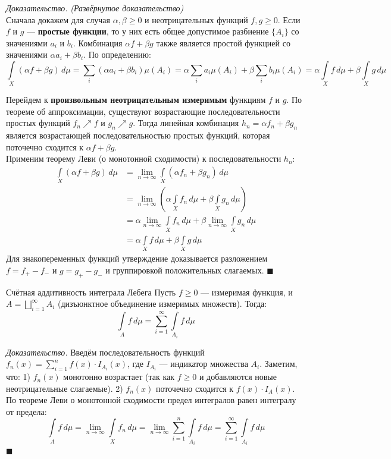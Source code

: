\documentclass[12pt,a4paper]{article}
\newenvironment{Proof}[1][Доказательство]{\vspace{0.5em}\noindent\textit{#1.}\hspace{0.5em}\ignorespaces}{\hfill$\blacksquare$\vspace{1em}}
\begin{document}
\begin{Proof}
\textit{(Развёрнутое доказательство)} \\
Сначала докажем для случая $\alpha, \beta \ge 0$ и неотрицательных функций $f, g \ge 0$.
Если $f$ и $g$ — \textbf{простые функции}, то у них есть общее допустимое разбиение $\{A_i\}$ со значениями $a_i$ и $b_i$. Комбинация $\alpha f + \beta g$ также является простой функцией со значениями $\alpha a_i + \beta b_i$. По определению:
$$ \int\limits_X (\alpha f + \beta g) \, d\mu = \sum\limits_{i} (\alpha a_i + \beta b_i) \mu(A_i) = \alpha \sum\limits_{i} a_i \mu(A_i) + \beta \sum\limits_{i} b_i \mu(A_i) = \alpha \int\limits_X f \, d\mu + \beta \int\limits_X g \, d\mu $$

Перейдем к \textbf{произвольным неотрицательным измеримым} функциям $f$ и $g$. По теореме об аппроксимации, существуют возрастающие последовательности простых функций $f_n \nearrow f$ и $g_n \nearrow g$. 
Тогда линейная комбинация $h_n = \alpha f_n + \beta g_n$ является возрастающей последовательностью простых функций, которая поточечно сходится к $\alpha f + \beta g$. \\
Применим теорему Леви (о монотонной сходимости) к последовательности $h_n$:
\begin{align*}
    \int\limits_X (\alpha f + \beta g) \, d\mu &= \lim\limits_{n \to \infty} \int\limits_X (\alpha f_n + \beta g_n) \, d\mu \\
    &= \lim\limits_{n \to \infty} \left( \alpha \int\limits_X f_n \, d\mu + \beta \int\limits_X g_n \, d\mu \right) \\
    &= \alpha \lim\limits_{n \to \infty} \int\limits_X f_n \, d\mu + \beta \lim\limits_{n \to \infty} \int\limits_X g_n \, d\mu \\
    &= \alpha \int\limits_X f \, d\mu + \beta \int\limits_X g \, d\mu
\end{align*}
Для знакопеременных функций утверждение доказывается разложением $f = f_+ - f_-$ и $g = g_+ - g_-$ и группировкой положительных слагаемых.
\end{Proof}
\begin{Lemma}{Счётная аддитивность интеграла Лебега}{}
Пусть $f \ge 0$ — измеримая функция, и $A = \bigsqcup\limits_{i=1}^{\infty} A_i$ (дизъюнктное объединение измеримых множеств). Тогда:
$$ \int\limits_A f \, d\mu = \sum\limits_{i=1}^{\infty} \int\limits_{A_i} f \, d\mu $$
\end{Lemma}

\begin{Proof}
Введём последовательность функций $f_n(x) = \sum\limits_{i=1}^n f(x) \cdot I_{A_i}(x)$, где $I_{A_i}$ — индикатор множества $A_i$.
Заметим, что:
1) $f_n(x)$ монотонно возрастает (так как $f \ge 0$ и добавляются новые неотрицательные слагаемые).
2) $f_n(x)$ поточечно сходится к $f(x) \cdot I_A(x)$.
По теореме Леви о монотонной сходимости предел интегралов равен интегралу от предела:
$$ \int\limits_A f \, d\mu = \lim\limits_{n \to \infty} \int\limits_X f_n \, d\mu = \lim\limits_{n \to \infty} \sum\limits_{i=1}^n \int\limits_{A_i} f \, d\mu = \sum\limits_{i=1}^{\infty} \int\limits_{A_i} f \, d\mu $$
\end{Proof}
\end{document}
